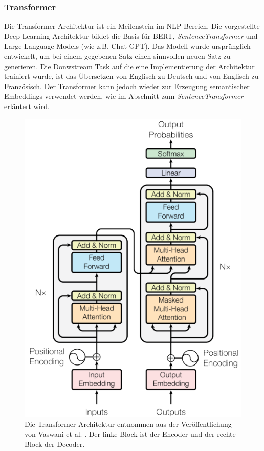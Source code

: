 \documentclass[12pt,letterpaper,ngerman]{article}
\begin{document}
\subsubsection{Transformer}
Die Transformer-Architektur \cite{transformer}
ist ein Meilenstein im NLP Bereich.
Die vorgestellte Deep Learning Architektur bildet die Basis
für BERT, \textit{SentenceTransformer} und Large Language-Models
(wie z.B. Chat-GPT).
Das Modell wurde ursprünglich entwickelt, um bei einem gegebenen
Satz 
einen sinnvollen neuen Satz zu generieren. Die Donwstream Task auf
die eine Implementierung der Architektur trainiert wurde,
ist das Übersetzen von Englisch zu Deutsch und von
Englisch zu Französisch. 
Der Transformer kann jedoch wieder zur Erzeugung semantischer Embeddings 
verwendet werden, wie im Abschnitt zum \textit{SentenceTransformer} erläutert
wird.
\begin{figure}
  \begin{center}
    \includegraphics[scale=0.5]{abb/transformer-figure.png}
  \end{center}
  \caption{
      Die Transformer-Architektur entnommen aus der Veröffentlichung 
      von Vaswani et al. \cite{transformer}.
      Der linke Block ist der Encoder und der rechte Block der Decoder.
  }
\end{figure} 
\end{document}
